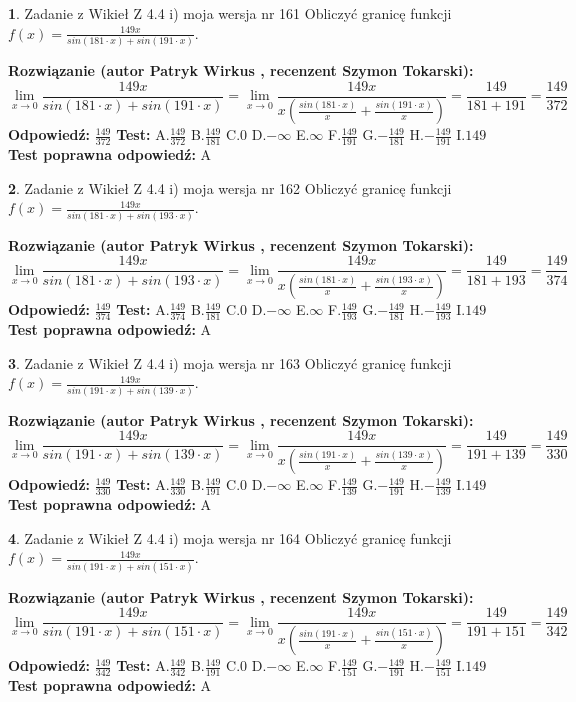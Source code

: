 \documentclass[12pt, a4paper]{article}
\theoremstyle{definition} %
\newtheorem{zad}{}
\newcommand{\zadStart}[1]{\begin{zad}#1\newline}
\newcommand{\zadStop}{\end{zad}}
\newcommand{\rozwStart}[2]{\noindent \textbf{Rozwiązanie (autor #1 , recenzent #2): }\newline}
\newcommand{\rozwStop}{\newline}
\newcommand{\odpStart}{\noindent \textbf{Odpowiedź:}\newline}
\newcommand{\odpStop}{\newline}
\newcommand{\testStart}{\noindent \textbf{Test:}\newline}
\newcommand{\testStop}{\newline}
\newcommand{\kluczStart}{\noindent \textbf{Test poprawna odpowiedź:}\newline}
\newcommand{\kluczStop}{\newline}
\begin{document}
\zadStart{Zadanie z Wikieł Z 4.4 i) moja wersja nr 161}
Obliczyć granicę funkcji $f(x)=\frac{149x}{sin(181\cdot x) +sin(191\cdot x)}$.
\zadStop
\rozwStart{Patryk Wirkus}{Szymon Tokarski}
$$\lim\limits_{x\to 0}\frac{149x}{sin(181\cdot x) +sin(191\cdot x)}=\lim\limits_{x\to 0}\frac{149x}{x(\frac{sin(181\cdot x)}{x}+\frac{sin(191\cdot x)}{x})}=\frac{149}{181+191} = \frac{149}{372}$$
\rozwStop
\odpStart
$\frac{149}{372}$
\odpStop
\testStart
A.$\frac{149}{372}$
B.$\frac{149}{181}$
C.$0$
D.$-\infty$
E.$\infty$
F.$\frac{149}{191}$
G.$-\frac{149}{181}$
H.$-\frac{149}{191}$
I.$149$
\testStop
\kluczStart
A
\kluczStop



\zadStart{Zadanie z Wikieł Z 4.4 i) moja wersja nr 162}
Obliczyć granicę funkcji $f(x)=\frac{149x}{sin(181\cdot x) +sin(193\cdot x)}$.
\zadStop
\rozwStart{Patryk Wirkus}{Szymon Tokarski}
$$\lim\limits_{x\to 0}\frac{149x}{sin(181\cdot x) +sin(193\cdot x)}=\lim\limits_{x\to 0}\frac{149x}{x(\frac{sin(181\cdot x)}{x}+\frac{sin(193\cdot x)}{x})}=\frac{149}{181+193} = \frac{149}{374}$$
\rozwStop
\odpStart
$\frac{149}{374}$
\odpStop
\testStart
A.$\frac{149}{374}$
B.$\frac{149}{181}$
C.$0$
D.$-\infty$
E.$\infty$
F.$\frac{149}{193}$
G.$-\frac{149}{181}$
H.$-\frac{149}{193}$
I.$149$
\testStop
\kluczStart
A
\kluczStop



\zadStart{Zadanie z Wikieł Z 4.4 i) moja wersja nr 163}
Obliczyć granicę funkcji $f(x)=\frac{149x}{sin(191\cdot x) +sin(139\cdot x)}$.
\zadStop
\rozwStart{Patryk Wirkus}{Szymon Tokarski}
$$\lim\limits_{x\to 0}\frac{149x}{sin(191\cdot x) +sin(139\cdot x)}=\lim\limits_{x\to 0}\frac{149x}{x(\frac{sin(191\cdot x)}{x}+\frac{sin(139\cdot x)}{x})}=\frac{149}{191+139} = \frac{149}{330}$$
\rozwStop
\odpStart
$\frac{149}{330}$
\odpStop
\testStart
A.$\frac{149}{330}$
B.$\frac{149}{191}$
C.$0$
D.$-\infty$
E.$\infty$
F.$\frac{149}{139}$
G.$-\frac{149}{191}$
H.$-\frac{149}{139}$
I.$149$
\testStop
\kluczStart
A
\kluczStop



\zadStart{Zadanie z Wikieł Z 4.4 i) moja wersja nr 164}
Obliczyć granicę funkcji $f(x)=\frac{149x}{sin(191\cdot x) +sin(151\cdot x)}$.
\zadStop
\rozwStart{Patryk Wirkus}{Szymon Tokarski}
$$\lim\limits_{x\to 0}\frac{149x}{sin(191\cdot x) +sin(151\cdot x)}=\lim\limits_{x\to 0}\frac{149x}{x(\frac{sin(191\cdot x)}{x}+\frac{sin(151\cdot x)}{x})}=\frac{149}{191+151} = \frac{149}{342}$$
\rozwStop
\odpStart
$\frac{149}{342}$
\odpStop
\testStart
A.$\frac{149}{342}$
B.$\frac{149}{191}$
C.$0$
D.$-\infty$
E.$\infty$
F.$\frac{149}{151}$
G.$-\frac{149}{191}$
H.$-\frac{149}{151}$
I.$149$
\testStop
\kluczStart
A
\kluczStop
\end{document}
